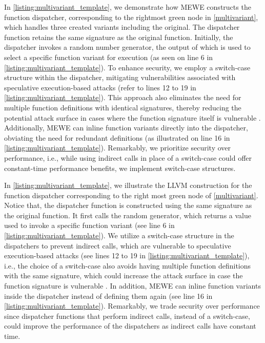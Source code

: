 
In \autoref{listing:multivariant_template}, we demonstrate how MEWE constructs the function dispatcher, corresponding to the rightmost green node in \autoref{multivariant}, which handles three created variants including the original. 
The dispatcher function retains the same signature as the original function. Initially, the dispatcher invokes a random number generator, the output of which is used to select a specific function variant for execution (as seen on line 6 in \autoref{listing:multivariant_template}). 
To enhance security, we employ a switch-case structure within the dispatcher, mitigating vulnerabilities associated with speculative execution-based attacks \cite{Narayan2021Swivel} (refer to lines 12 to 19 in \autoref{listing:multivariant_template}). 
This approach also eliminates the need for multiple function definitions with identical signatures, thereby reducing the potential attack surface in cases where the function signature itself is vulnerable \cite{johnson2021}.
Additionally, MEWE can inline function variants directly into the dispatcher, obviating the need for redundant definitions (as illustrated on line 16 in \autoref{listing:multivariant_template}). 
Remarkably, we prioritize security over performance, i.e., while using indirect calls in place of a switch-case could offer constant-time performance benefits, we implement switch-case structures.

In  \autoref{listing:multivariant_template}, we illustrate the LLVM construction for the function dispatcher corresponding to the right most green node of \autoref{multivariant}.
Notice that, the dispatcher function is constructed using the same signature as the original function. 
It first calls the random generator, which returns a value used to invoke a specific function variant (see line 6 in \autoref{listing:multivariant_template}). 
We utilize a switch-case structure in the dispatchers to prevent indirect calls, which are vulnerable to speculative execution-based attacks \cite{Narayan2021Swivel} (see lines 12 to 19 in \autoref{listing:multivariant_template}), i.e., the choice of a switch-case also avoids having multiple function definitions with the same signature, which could increase the attack surface in case the function signature is vulnerable \cite{johnson2021}.
In addition, MEWE can inline function variants inside the dispatcher instead of defining them again (see line 16 in \autoref{listing:multivariant_template}).
Remarkably, we trade security over performance since dispatcher functions that perform indirect calls, instead of a switch-case,  could improve the performance of the dispatchers as indirect calls have constant time.



